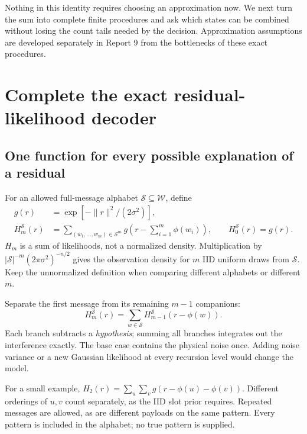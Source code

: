 \documentclass[10pt,a4paper]{article}
\newcommand{\calW}{\mathcal W}
\begin{document}
Nothing in this identity requires choosing an approximation now. We next turn the sum into complete finite
procedures and ask which states can be combined without losing the count tails needed by the decision.
Approximation assumptions are developed separately in Report 9 from the bottlenecks of these exact procedures.

\clearpage
\section{Complete the exact residual-likelihood decoder}
\label{sec:residual-exact}
\subsection{One function for every possible explanation of a residual}
For an allowed full-message alphabet $\mathcal S\subseteq\calW$, define
\begin{align}
 g(r)&=\exp[-\|r\|^2/(2\sigma^2)],\\
 H_m^{\mathcal S}(r)&=
 \sum_{(w_1,\ldots,w_m)\in\mathcal S^m}
       g\!\left(r-\sum_{i=1}^m\phi(w_i)\right),\qquad H_0^{\mathcal S}(r)=g(r).
 \label{eq:ordered-evidence}
\end{align}
$H_m$ is a sum of likelihoods, not a normalized density. Multiplication by
$|\mathcal S|^{-m}(2\pi\sigma^2)^{-n/2}$ gives the observation density for $m$ IID uniform draws from $\mathcal S$.
Keep the unnormalized definition when comparing different alphabets or different $m$.

Separate the first message from its remaining $m-1$ companions:
\begin{equation}
 \boxed{H_m^{\mathcal S}(r)=
        \sum_{w\in\mathcal S}H_{m-1}^{\mathcal S}(r-\phi(w)).}
 \label{eq:residual-recursion}
\end{equation}
Each branch subtracts a \emph{hypothesis}; summing all branches integrates out the interference exactly.
The base case contains the physical noise once. Adding noise variance or a new Gaussian likelihood at every
recursion level would change the model.

For a small example, $H_2(r)=\sum_u\sum_v g(r-\phi(u)-\phi(v))$. Different orderings of $u,v$ count separately,
as the IID slot prior requires. Repeated messages are allowed, as are different payloads on the same pattern.
Every pattern is included in the alphabet; no true pattern is supplied.
\end{document}
